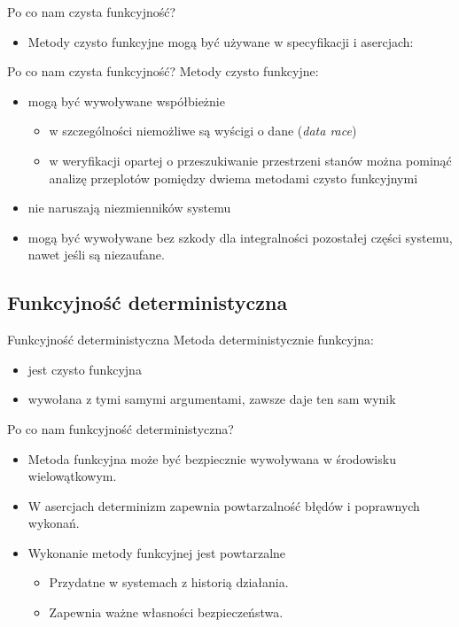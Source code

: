 \documentclass{beamer}
\begin{document}
\begin{frame}{Po co nam czysta funkcyjność?}
  \begin{itemize}
    \item Metody czysto funkcyjne mogą być używane w specyfikacji i asercjach:
  \end{itemize}
  
\end{frame}

\begin{frame}{Po co nam czysta funkcyjność?}
  Metody czysto funkcyjne:
  \begin{itemize}
  \item<1-> mogą być wywoływane współbieżnie
    \begin{itemize}
    \item w szczególności niemożliwe są wyścigi o dane (\textsl{data race})
    \item w weryfikacji opartej o przeszukiwanie przestrzeni stanów 
      można pominąć analizę przeplotów pomiędzy dwiema metodami
      czysto funkcyjnymi
    \end{itemize}
  \item<2-> nie naruszają niezmienników systemu
  \item<3-> mogą być wywoływane bez szkody dla integralności 
    pozostałej części systemu, nawet jeśli są niezaufane. 
  \end{itemize}
\end{frame}

\subsection{Funkcyjność deterministyczna}

\begin{frame}{Funkcyjność deterministyczna}
  Metoda deterministycznie funkcyjna:
  \begin{itemize}
  \item jest czysto funkcyjna
  \item wywołana z \alert<2>{tymi samymi} argumentami, zawsze daje ten sam wynik
  \end{itemize}
\end{frame}

\begin{frame}{Po co nam funkcyjność deterministyczna?}
  \begin{itemize}
  \item Metoda funkcyjna może być bezpiecznie wywoływana w środowisku
    wielowątkowym.
  \item W asercjach determinizm zapewnia powtarzalność błędów i 
    poprawnych wykonań.
  \item Wykonanie metody funkcyjnej jest powtarzalne
    \begin{itemize}
    \item Przydatne w systemach z historią działania.
    \item Zapewnia ważne własności bezpieczeństwa.
    \end{itemize}
  \end{itemize}
\end{frame}
\end{document}
